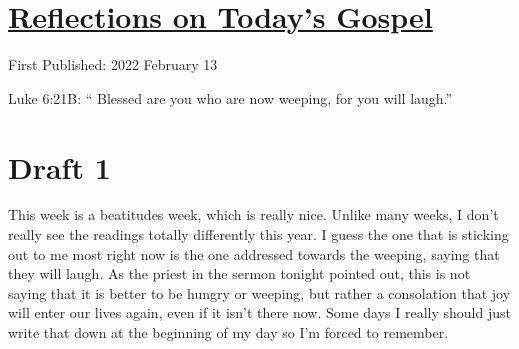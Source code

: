 \documentclass[12pt]{article}[titlepage]
\newcommand{\say}[1]{``#1''}
\newcommand{\1}{\={a}}
\newcommand{\2}{\={e}}
\newcommand{\3}{\={\i}}
\newcommand{\4}{\=o}
\newcommand{\5}{\=u}
\newcommand{\6}{\={A}}
\renewcommand{\,}{\textsuperscript{,}}
\begin{document}
\doublespacing
\section{\href{reflections-on-readings-6-ordinary-c-22.html}{Reflections on Today's Gospel}}
First Published: 2022 February 13

Luke 6:21B: \say{  Blessed are you who are now weeping,
                        for you will laugh.}

\section{Draft 1}
This week is a beatitudes week, which is really nice.
Unlike many weeks, I don't really see the readings totally differently this year.
I guess the one that is sticking out to me most right now is the one addressed towards the weeping, saying that they will laugh.
As the priest in the sermon tonight pointed out, this is not saying that it is better to be hungry or weeping, but rather a consolation that joy will enter our lives again, even if it isn't there now.
Some days I really should just write that down at the beginning of my day so I'm forced to remember.
\end{document}
